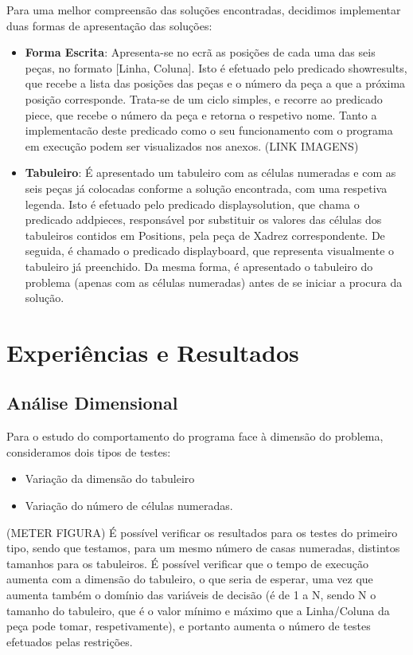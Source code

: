 \documentclass[runningheads]{llncs}
\begin{document}
Para uma melhor compreensão das soluções encontradas, decidimos implementar duas formas de apresentação das soluções:
\begin{itemize}
    \item \textbf{Forma Escrita}:
    Apresenta-se no ecrã as posições de cada uma das seis peças, no formato [Linha, Coluna].
    Isto é efetuado pelo predicado show\textunderscore results, que recebe a lista das posições das peças e o número da peça a que a próxima posição corresponde. Trata-se de um ciclo simples, e recorre ao predicado piece, que recebe o número da peça e retorna o respetivo nome.
    Tanto a implementacão deste predicado como o seu funcionamento com o programa em execução podem ser visualizados nos anexos. (LINK IMAGENS)
    \item \textbf{Tabuleiro}:
    É apresentado um tabuleiro com as células numeradas e com as seis peças já colocadas conforme a solução encontrada, com uma respetiva legenda.
    Isto é efetuado pelo predicado display\textunderscore solution, que chama o predicado add\textunderscore pieces, responsável por substituir os valores das células dos tabuleiros contidos em Positions, pela peça de Xadrez correspondente. De seguida, é chamado o predicado display\textunderscore board, que representa visualmente o tabuleiro já preenchido.
    Da mesma forma, é apresentado o tabuleiro do problema (apenas com as células numeradas) antes de se iniciar a procura da solução.
\end{itemize}

\section{Experiências e Resultados}
\subsection{Análise Dimensional}
Para o estudo do comportamento do programa face à dimensão do problema, consideramos dois tipos de testes: 
\begin{itemize}
    \item Variação da dimensão do tabuleiro
    \item Variação do número de células numeradas.
\end{itemize}

(METER FIGURA)
É possível verificar os resultados para os testes do primeiro tipo, sendo que testamos, para um mesmo número de casas numeradas, distintos tamanhos para os tabuleiros.
É possível verificar que o tempo de execução aumenta com a dimensão do tabuleiro, o que seria de esperar, uma vez que aumenta também o domínio das variáveis de decisão (é de 1 a N, sendo N o tamanho do tabuleiro, que é o valor mínimo e máximo que a Linha/Coluna da peça pode tomar, respetivamente), e portanto aumenta o número de testes efetuados pelas restrições.
\end{document}
